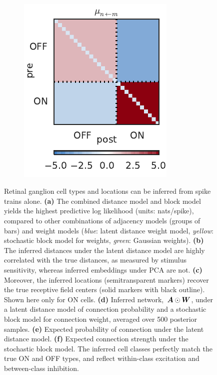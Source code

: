\begin{figure}[t!]
\begin{subfigure}[b]{1.85in}
    \label{fig:rgc_rho}
  \end{subfigure}
  ~
  \begin{subfigure}[b]{1.85in}
    \centering
    \caption{}
    \vspace{-.2in}
    \includegraphics[width=\textwidth]{figures/ch3/rgc_mean_conn.pdf}
    \label{fig:rgc_mu}
  \end{subfigure}
  \vspace{-2em}
  \caption{Retinal ganglion cell types and locations can be inferred
    from spike trains alone.
    \textbf{(a)} The combined distance model and block model yields the highest predictive log likelihood (units: nats/spike), compared to other combinations of adjacency models (groups of bars) and weight models (\textit{blue}: latent distance weight model, \textit{yellow}: stochastic block model for weights, \textit{green}: Gaussian weights).
    \textbf{(b)} The inferred distances under the latent distance model are highly correlated with the true distances, as measured by stimulus sensitivity, whereas inferred embeddings under PCA are not.
    \textbf{(c)} Moreover, the inferred locations (semitransparent markers) recover the true receptive field centers (solid markers with black outline). Shown here only for ON cells.
    \textbf{(d)} Inferred network,~${\boldsymbol{A} \odot \boldsymbol{W}}$, under a latent distance model of connection probability and a stochastic block model for connection weight, averaged over 500 posterior samples.
    \textbf{(e)} Expected probability of connection under the latent distance model.
    \textbf{(f)} Expected connection strength under the stochastic block model. The inferred cell classes perfectly match the true ON and OFF types, and reflect within-class excitation and between-class inhibition.
}
  \label{fig:rgc}
\end{figure}

